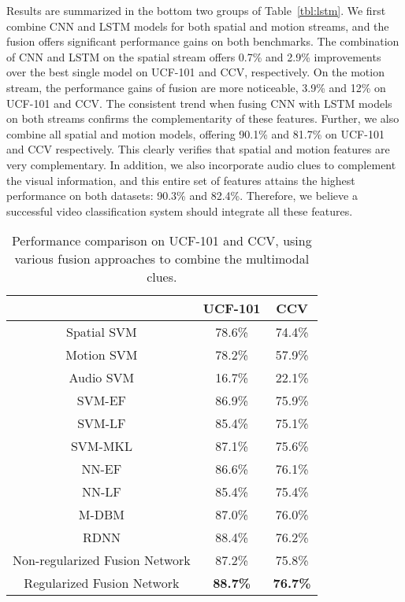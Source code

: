 \documentclass[journal]{IEEEtran}
\begin{document}
Results are summarized in the bottom two groups of Table~\ref{tbl:lstm}. We first combine CNN and LSTM models for both spatial and motion streams, and the fusion offers significant performance gains on both benchmarks. The combination of CNN and LSTM on the spatial stream offers 0.7\% and 2.9\% improvements over the best single model on UCF-101 and CCV, respectively. On the motion stream, the performance gains of fusion are more noticeable, 3.9\% and 12\% on UCF-101 and CCV. The consistent trend when fusing CNN with LSTM models on both streams confirms the complementarity of these features. Further, we also combine all spatial and motion models, offering 90.1\% and 81.7\% on UCF-101 and CCV respectively. This clearly verifies that spatial and motion features are very complementary. In addition, we also incorporate audio clues to complement the visual information, and this entire set of features attains the highest performance on both datasets: 90.3\% and 82.4\%. Therefore, we believe a successful video classification system should integrate all these features. 

\begin{table}[t]
\begin{center}
\caption{\label{tbl:fusion} Performance comparison on UCF-101 and CCV, using various fusion approaches to combine the multimodal clues. }
\begin{tabular}{|c||c|c|}
\hline
            & UCF-101      & CCV                              \\ \hline\hline

 
Spatial SVM   & 78.6\%          & 74.4\%                          \\ 
Motion SVM      & 78.2\%          & 57.9\%                          \\ %
Audio SVM 		& 16.7\% 		& 22.1\%		\\
\hline\hline

SVM-EF            & 86.9\%          & 75.9\%                          \\ 
SVM-LF            & 85.4\%          & 75.1\%                          \\  
SVM-MKL           & 87.1\%          & 75.6\%                          \\ \hline  \hline
NN-EF             & 86.6\%          & 76.1\%                          \\ 
NN-LF             & 85.4\%          & 75.4\%                          \\ 
M-DBM             & 87.0\%          & 76.0\%                          \\ 
RDNN    & 88.4\%        & 76.2\%              \\ \hline \hline

Non-regularized Fusion Network          
          & 87.2\%      & 75.8\%              \\ 
Regularized Fusion Network
          & {\bf 88.7\% }   & {\bf 76.7\% }             \\ \hline
\end{tabular}
\end{center}
\end{table}
\end{document}
